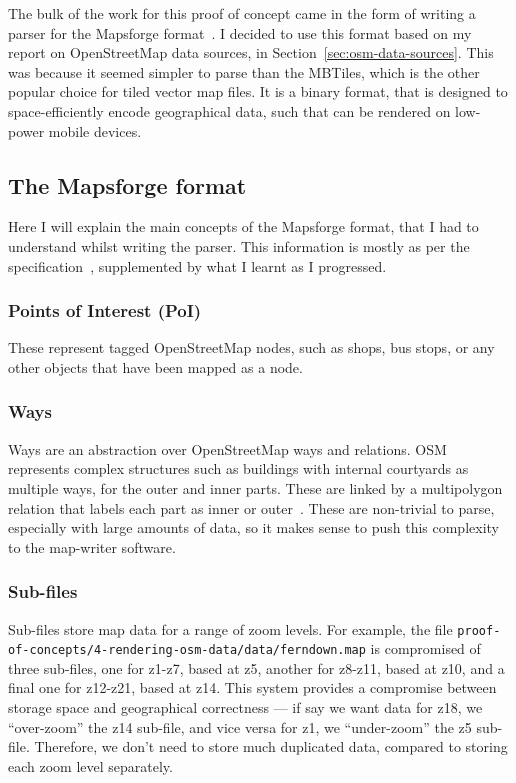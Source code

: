 \documentclass[]{final_report}
\begin{document}
The bulk of the work for this proof of concept came in the form of writing a parser for the Mapsforge format~\cite{mapsforge-format}. I decided to use this format based on my report on OpenStreetMap data sources, in Section~\ref{sec:osm-data-sources}. This was because it seemed simpler to parse than the MBTiles, which is the other popular choice for tiled vector map files. It is a binary format, that is designed to space-efficiently encode geographical data, such that can be rendered on low-power mobile devices.

\subsection{The Mapsforge format}

Here I will explain the main concepts of the Mapsforge format, that I had to understand whilst writing the parser. This information is mostly as per the specification~\cite{mapsforge-format}, supplemented by what I learnt as I progressed. 

\subsubsection{Points of Interest (PoI)}

These represent tagged OpenStreetMap nodes, such as shops, bus stops, or any other objects that have been mapped as a node.

\subsubsection{Ways}

Ways are an abstraction over OpenStreetMap ways and relations. OSM represents complex structures such as buildings with internal courtyards as multiple ways, for the outer and inner parts. These are linked by a multipolygon relation that labels each part as inner or outer~\cite{osm-wiki-multipolygon}. These are non-trivial to parse, especially with large amounts of data, so it makes sense to push this complexity to the map-writer software.

\subsubsection{Sub-files}


Sub-files store map data for a range of zoom levels. For example, the file \texttt{proof\--of\--concepts/4\--rendering\--osm\--data\-/data/ferndown.map} is compromised of three sub-files, one for z1-z7, based at z5, another for z8-z11, based at z10, and a final one for z12-z21, based at z14. This system provides a compromise between storage space and geographical correctness --- if say we want data for z18, we ``over-zoom'' the z14 sub-file, and vice versa for z1, we ``under-zoom'' the z5 sub-file. Therefore, we don't need to store much duplicated data, compared to storing each zoom level separately.
    
\end{document}
